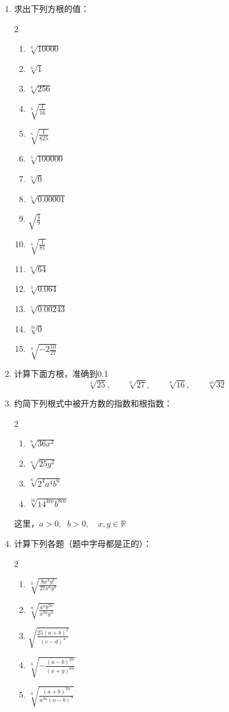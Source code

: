 \begin{ex}
\begin{enumerate}
    \item 求出下列方根的值：
    \begin{multicols}{2}
\begin{enumerate}
    \item $\sqrt[4]{10000}$
    \item $\sqrt[4]{1}$
    \item $\sqrt[4]{256}$
    \item $\sqrt[4]{\frac{1}{16}}$
    \item $\sqrt[4]{\frac{1}{625}}$
    \item $\sqrt[5]{100000}$
    \item $\sqrt[5]{0}$
    \item $\sqrt[5]{0.00001}$
    \item $\sqrt{\frac{4}{9}}$
    \item $\sqrt[4]{\frac{1}{81}}$
    \item $\sqrt[6]{64}$
    \item $\sqrt[3]{0.064}$
    \item $\sqrt[5]{0.00243}$
    \item $\sqrt[10]{0}$
    \item $\sqrt[3]{-2 \frac{10}{27}}$
\end{enumerate}        
    \end{multicols}

\item 计算下面方根，准确到0.1
\[\sqrt[4]{25},\qquad \sqrt[6]{27},\qquad \sqrt[8]{16},\qquad \sqrt[10]{32} \]

\item 约简下列根式中被开方数的指数和根指数：
\begin{multicols}{2}
\begin{enumerate}
    \item $\sqrt[6]{36 x^{2}}$
    \item $\sqrt[4]{25 y^{2}}$
    \item $\sqrt[8]{2^{4} a^{4} b^{6}}$
    \item $\sqrt[16]{14^{4m} b^{8m}}$
\end{enumerate}
\end{multicols}
这里，$a>0,\;\; b>0,\quad x,y\in\mathbb{R}$


\item 计算下列各题（题中字母都是正的）：
\begin{multicols}{2}
    \begin{enumerate}
    \item $\sqrt[3]{\frac{8 x^{3} y^{6}}{27 x^{6} y^{9}}}$
    \item $\sqrt[n]{\frac{a^{n} b^{2n}}{x^{3 n} y^{n}}}$
    \item $\sqrt{\frac{25(a+b)^{2}}{(c-d)^{4}}}$
    \item $\sqrt[3]{-\frac{(a-b)^{3 n}}{(x+y)^{6n}}}$
    \item $\sqrt[n]{\frac{(a+b)^{2 n}}{a^{3 n}(a-b)^{n}}}$
\end{enumerate}
\end{multicols}


\end{enumerate}
\end{ex}
